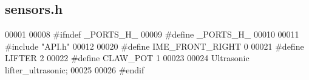 \subsection{sensors.\+h}
\label{sensors_8h_source}

\begin{DoxyCode}
00001 
00008 \textcolor{preprocessor}{#ifndef \_PORTS\_H\_}
00009 \textcolor{preprocessor}{#define \_PORTS\_H\_}
00010 
00011 \textcolor{preprocessor}{#include "API.h"}
00012 
00020 \textcolor{preprocessor}{#define IME\_FRONT\_RIGHT 0}
00021 \textcolor{preprocessor}{#define LIFTER 2}
00022 \textcolor{preprocessor}{#define CLAW\_POT 1}
00023 
00024 Ultrasonic lifter_ultrasonic;
00025 
00026 \textcolor{preprocessor}{#endif}
\end{DoxyCode}

